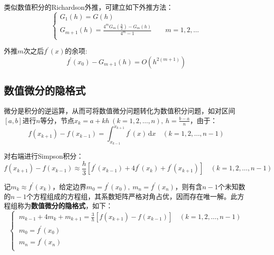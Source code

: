 类似数值积分的Richardson外推，可建立如下外推方法：
\begin{equation}
    \begin{cases}
        G_1(h) = G(h) \\[4mm]
        G_{m+1}(h) = {\displaystyle \frac{4^mG_m(\frac{h}{2}) - G_m(h)}{4^m - 1}} \qquad m = 1,2,\dots\\
    \end{cases}
\end{equation}

外推$m$次之后$f^{\prime}(x)$的余项:
\begin{equation*}
    f^{\prime}(x_0) - G_{m+1}(h) = O(h^{2(m+1)})
\end{equation*}


\newpage
\subsection{数值微分的隐格式}
微分是积分的逆运算，从而可将数值微分问题转化为数值积分问题，如对区间$[a,b]$进行$n$等分，节点${\displaystyle x_k=a+kh\ (k=1,2,\dots,n),\ h=\frac{b-a}{n}}$，由于：
\begin{equation*}
    f(x_{k+1}) - f(x_{k-1}) = \int_{x_{k-1}}^{x_{k+1}} f^{\prime}(x)\,\mathrm{d}x \quad (k=1,2,\dots,n-1)
\end{equation*}

对右端进行Simpson积分：
\begin{equation*}
    f(x_{k+1}) - f(x_{k-1}) \approx \frac{h}{3}[f^{\prime}(x_{k-1}) + 4f^{\prime}(x_k) + f^{\prime}(x_{k+1})] \quad (k=1,2,\dots,n-1)
\end{equation*}

记$m_k \approx f^{\prime}(x_k)$，给定边界$m_0 = f^{\prime}(x_0),\ m_n = f^{\prime}(x_n)$，则有含$n-1$个未知数的$n-1$个方程组成的方程组，其系数矩阵严格对角占优，因而存在唯一解。此方程组称为\textbf{数值微分的隐格式}，如下：
\begin{equation}
    \begin{cases}\displaystyle
        \ m_{k-1} + 4m_k + m_{k+1} = \frac{3}{h} [f(x_{k+1}) - f(x_{k-1})] \quad (k=1,2,\dots,n-1)\\[3mm]
        \ m_0 = f^{\prime}(x_0) \\[3mm]
        \ m_n = f^{\prime}(x_n) \\
    \end{cases}
\end{equation}


